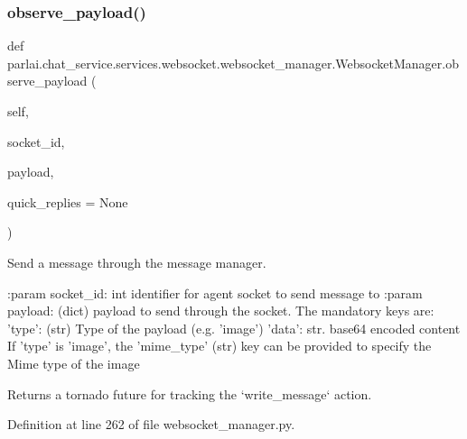 \subsubsection{\texorpdfstring{observe\+\_\+payload()}{observe\_payload()}}
{\footnotesize\ttfamily def parlai.\+chat\+\_\+service.\+services.\+websocket.\+websocket\+\_\+manager.\+Websocket\+Manager.\+observe\+\_\+payload (\begin{DoxyParamCaption}\item[{}]{self,  }\item[{}]{socket\+\_\+id,  }\item[{}]{payload,  }\item[{}]{quick\+\_\+replies = {\ttfamily None} }\end{DoxyParamCaption})}

\begin{DoxyVerb}Send a message through the message manager.

:param socket_id:
    int identifier for agent socket to send message to
:param payload:
    (dict) payload to send through the socket. The mandatory keys are:
    'type': (str) Type of the payload (e.g. 'image')
    'data': str. base64 encoded content
    If 'type' is 'image', the 'mime_type' (str) key can be provided
    to specify the Mime type of the image

Returns a tornado future for tracking the `write_message` action.
\end{DoxyVerb}
 

Definition at line 262 of file websocket\+\_\+manager.\+py.


